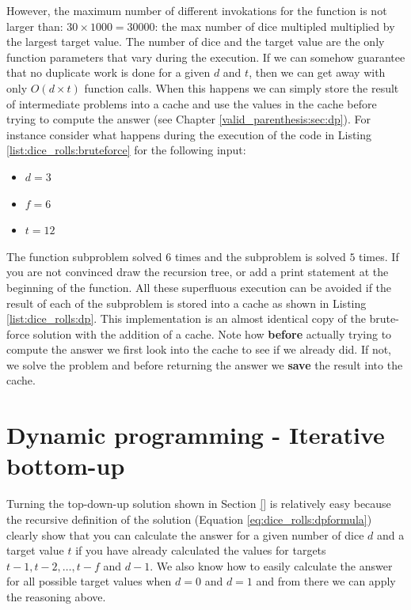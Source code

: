 However, the maximum number of different invokations for the function
 is not larger than: $30\times 1000 = 30000$: the max number
of dice multipled  multiplied by the largest target value. The number of dice and the target value
are the only function parameters that vary during the execution. If we can somehow guarantee that no
duplicate work is done for a given $d$ and $t$, then we can get away with only $O(d\times t)$
function calls. When this happens we can simply store the result of intermediate problems into a
cache and use the values in the cache before trying to compute the answer (see Chapter
\ref{valid_parenthesis:sec:dp}). For instance consider what happens during the execution of the code
in Listing \ref{list:dice_rolls:bruteforce} for the following input:
\begin{itemize}
	\item $d = 3$
	\item $f = 6$
	\item $t = 12$
\end{itemize}

The function subproblem  solved $6$ times and the
subproblem  is solved $5$ times. If you are not
convinced draw the recursion tree, or add a print statement at the beginning of the function. All
these superfluous execution can be avoided if the result of each of the subproblem is stored into a
cache as shown in Listing \ref{list:dice_rolls:dp}. This implementation is an almost identical copy
of the brute-force solution with the addition of a cache. Note how \textbf{before} actually trying
to compute the answer we first look into the cache to see if we already did. If not, we solve the
problem and before returning the answer we \textbf{save} the result into the cache.



\section{Dynamic programming - Iterative bottom-up}
\label{dice_rolls:sec:bottom}
Turning the top-down-up solution shown in Section \ref{} is relatively easy because the recursive
definition of the solution (Equation \ref{eq:dice_rolls:dpformula}) clearly show that you can
calculate the answer for a given number of dice $d$ and a target value $t$ if you have already
calculated the values for targets $t-1, t-2, \ldots, t-f$ and $d-1$. We also know how to easily
calculate the answer for all possible target values when $d=0$ and $d=1$ and from there we can apply
the reasoning above. 

